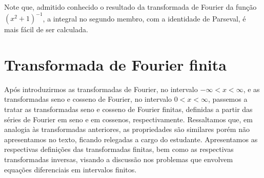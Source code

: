 

Note que, admitido conhecido o resultado da transformada de Fourier da função $(x^{2} + 1)^{-1}$, a integral no segundo membro, com a identidade de Parseval, é mais
fácil de ser calculada.




\section{Transformada de Fourier finita}

Após introduzirmos as transformadas de Fourier, no intervalo $-\infty < x < \infty$, e as transformadas seno e cosseno de Fourier, no intervalo $0 < x < \infty$, passemos a tratar as transformadas seno e cosseno de Fourier finitas, definidas a partir das séries de Fourier em seno e em cossenos, respectivamente. Ressaltamos que, em analogia às transformadas anteriores, as propriedades são similares porém não apresentamos no texto, ficando relegadas a cargo do estudante. Apresentamos as respectivas definições das transformadas finitas, bem como as respectivas transformadas inversas, visando a discussão nos problemas que envolvem equações diferenciais em intervalos finitos.

